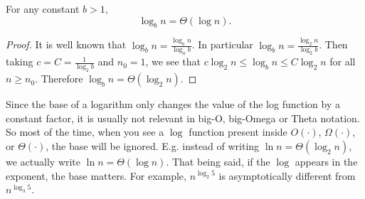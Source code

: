 \begin{flex}
\label{grp:proposition:Logarithms-in-different-bases}

\begin{proposition}
\label{proposition:Logarithms-in-different-bases}
For any constant $b > 1$,
\[
\log_b n = \Theta(\log n).
\]

\end{proposition}

\begin{proof}
\label{prf:time-complexity::well}
It is well known that $\log_b n = \frac{\log_a n}{\log_a b}$. In particular $\log_b n = \frac{\log_2 n}{\log_2 b}$. Then taking $c = C = \frac{1}{\log_2 b}$ and $n_0 = 1$, we see that $c \log_2 n \leq \log_b n \leq C \log_2 n$ for all $n \geq n_0$. Therefore $\log_b n = \Theta(\log_2 n)$. 

\end{proof}
\end{flex}

\begin{note}
\label{note:Does-the-base-of-a-logarithm-matter}
Since the base of a logarithm only changes the value of the log function by a constant factor, it is usually not relevant in big-O, big-Omega or Theta notation. So most of the time, when you see a $\log$ function present inside $O(\cdot)$, $\Omega(\cdot)$, or $\Theta(\cdot)$, the base will be ignored. E.g. instead of writing $\ln n = \Theta(\log_2 n)$, we actually write $\ln n = \Theta(\log n)$. That being said, if the $\log$ appears in the exponent, the base matters. For example, $n^{\log_2 5}$ is asymptotically different from $n^{\log_3 5}$.

\end{note}

